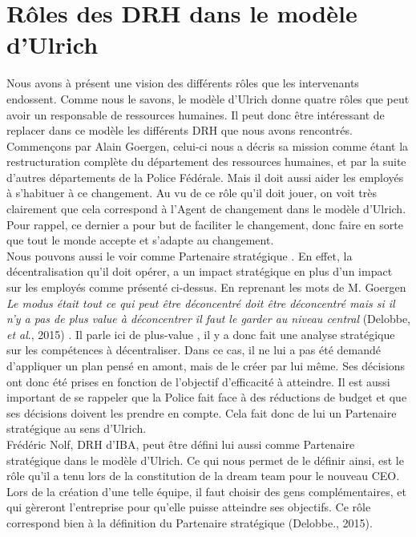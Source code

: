 \section{Rôles des DRH dans le modèle d'Ulrich}

Nous avons à présent une vision des différents rôles que les intervenants endossent. Comme nous le savons, le modèle d'Ulrich donne quatre rôles que peut avoir un responsable de ressources humaines. Il peut donc être intéressant de replacer dans ce modèle les différents DRH que nous avons rencontrés. \\

Commençons par Alain Goergen, celui-ci nous a décris sa mission comme étant la restructuration complète du département des ressources humaines, et par la suite d'autres départements de la Police Fédérale. Mais il doit aussi aider les employés à s'habituer à ce changement. Au vu de ce rôle qu'il doit jouer, on voit très clairement que cela correspond à l'\og Agent de changement \fg{} dans le modèle d'Ulrich. Pour rappel, ce dernier a pour but de faciliter le changement, donc faire en sorte que tout le monde accepte et s'adapte au changement.\\

Nous pouvons aussi le voir comme \og Partenaire stratégique \fg{}. En effet, la décentralisation qu'il doit opérer, a un impact stratégique en plus d'un impact sur les employés comme présenté ci-dessus. En reprenant les mots de M. Goergen \textit{\og Le modus était tout ce qui peut être déconcentré doit être déconcentré mais si il n'y a pas de plus value à déconcentrer il faut le garder au niveau central \fg{}} (Delobbe, \textit{et al}., 2015) . Il parle ici de \og plus-value \fg{}, il y a donc fait une analyse stratégique sur les compétences à décentraliser. Dans ce cas, il ne lui a pas été demandé d'appliquer un plan pensé en amont, mais de le créer par lui même. Ses décisions ont donc été prises en fonction de l'objectif d'efficacité à atteindre. Il est aussi important de se rappeler que la Police fait face à des réductions de budget et que ses décisions doivent les prendre en compte. Cela fait donc de lui un \og Partenaire stratégique \fg{} au sens d'Ulrich.\\   

Frédéric Nolf, DRH d'IBA, peut être défini lui aussi comme \og{}Partenaire stratégique\fg{} dans le modèle d'Ulrich. Ce qui nous permet de le définir ainsi, est le rôle qu'il a tenu lors de la constitution de la \og dream team\fg{} pour le nouveau CEO. Lors de la création d'une telle équipe, il faut choisir des gens complémentaires, et qui gèreront l'entreprise pour qu'elle puisse atteindre ses objectifs. Ce rôle correspond bien à la définition du \og Partenaire stratégique \fg{} (Delobbe., 2015).\newline

